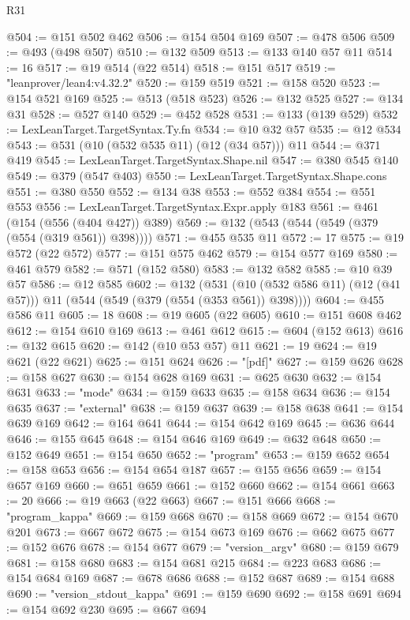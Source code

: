 \begin{lexlean}{R31}
\begin{coremodule}
@504 := @151 @502 @462
@506 := @154 @504 @169
@507 := @478 @506
@509 := @493 (@498 @507)
@510 := @132 @509
@513 := @133 @140 @57 @11
@514 := 16
@517 := @19 @514 (@22 @514)
@518 := @151 @517
@519 := "leanprover/lean4:v4.32.2"
@520 := @159 @519
@521 := @158 @520
@523 := @154 @521 @169
@525 := @513 (@518 @523)
@526 := @132 @525
@527 := @134 @31
@528 := @527 @140
@529 := @452 @528
@531 := @133 (@139 @529)
@532 := LexLeanTarget.TargetSyntax.Ty.fn
@534 := @10 @32 @57
@535 := @12 @534
@543 := @531 (@10 (@532 @535 @11) (@12 (@34 @57))) @11
@544 := @371 @419
@545 := LexLeanTarget.TargetSyntax.Shape.nil
@547 := @380 @545 @140
@549 := @379 (@547 @403)
@550 := LexLeanTarget.TargetSyntax.Shape.cons
@551 := @380 @550
@552 := @134 @38
@553 := @552 @384
@554 := @551 @553
@556 := LexLeanTarget.TargetSyntax.Expr.apply @183
@561 := @461 (@154 (@556 (@404 @427)) @389)
@569 := @132 (@543 (@544 (@549 (@379 (@554 (@319 @561)) @398))))
@571 := @455 @535 @11
@572 := 17
@575 := @19 @572 (@22 @572)
@577 := @151 @575 @462
@579 := @154 @577 @169
@580 := @461 @579
@582 := @571 (@152 @580)
@583 := @132 @582
@585 := @10 @39 @57
@586 := @12 @585
@602 := @132
    (@531 (@10 (@532 @586 @11) (@12 (@41 @57))) @11 (@544 (@549 (@379 (@554 (@353 @561)) @398))))
@604 := @455 @586 @11
@605 := 18
@608 := @19 @605 (@22 @605)
@610 := @151 @608 @462
@612 := @154 @610 @169
@613 := @461 @612
@615 := @604 (@152 @613)
@616 := @132 @615
@620 := @142 (@10 @53 @57) @11
@621 := 19
@624 := @19 @621 (@22 @621)
@625 := @151 @624
@626 := "[pdf]"
@627 := @159 @626
@628 := @158 @627
@630 := @154 @628 @169
@631 := @625 @630
@632 := @154 @631
@633 := "mode"
@634 := @159 @633
@635 := @158 @634
@636 := @154 @635
@637 := "external"
@638 := @159 @637
@639 := @158 @638
@641 := @154 @639 @169
@642 := @164 @641
@644 := @154 @642 @169
@645 := @636 @644
@646 := @155 @645
@648 := @154 @646 @169
@649 := @632 @648
@650 := @152 @649
@651 := @154 @650
@652 := "program"
@653 := @159 @652
@654 := @158 @653
@656 := @154 @654 @187
@657 := @155 @656
@659 := @154 @657 @169
@660 := @651 @659
@661 := @152 @660
@662 := @154 @661
@663 := 20
@666 := @19 @663 (@22 @663)
@667 := @151 @666
@668 := "program_kappa"
@669 := @159 @668
@670 := @158 @669
@672 := @154 @670 @201
@673 := @667 @672
@675 := @154 @673 @169
@676 := @662 @675
@677 := @152 @676
@678 := @154 @677
@679 := "version_argv"
@680 := @159 @679
@681 := @158 @680
@683 := @154 @681 @215
@684 := @223 @683
@686 := @154 @684 @169
@687 := @678 @686
@688 := @152 @687
@689 := @154 @688
@690 := "version_stdout_kappa"
@691 := @159 @690
@692 := @158 @691
@694 := @154 @692 @230
@695 := @667 @694

\end{coremodule}
\end{lexlean}
